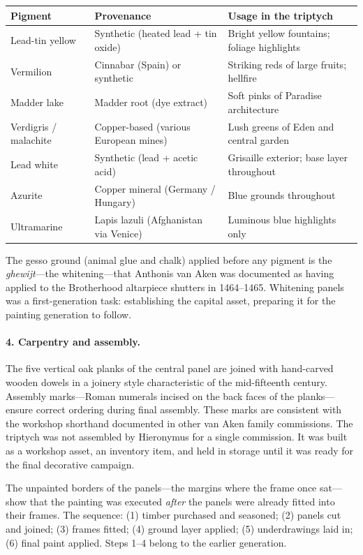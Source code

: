 \begin{center}
\begin{tabular}{lll}
\toprule
\textbf{Pigment} & \textbf{Provenance} & \textbf{Usage in the triptych} \\
\midrule
Lead-tin yellow & Synthetic (heated lead + tin oxide) & Bright yellow fountains; foliage highlights \\
Vermilion & Cinnabar (Spain) or synthetic & Striking reds of large fruits; hellfire \\
Madder lake & Madder root (dye extract) & Soft pinks of Paradise architecture \\
Verdigris / malachite & Copper-based (various European mines) & Lush greens of Eden and central garden \\
Lead white & Synthetic (lead + acetic acid) & Grisaille exterior; base layer throughout \\
Azurite & Copper mineral (Germany / Hungary) & Blue grounds throughout \\
Ultramarine & Lapis lazuli (Afghanistan via Venice) & Luminous blue highlights only \\
\bottomrule
\end{tabular}
\end{center}

The gesso ground (animal glue and chalk) applied before any pigment is the
\textit{ghewijt}---the whitening---that Anthonis van Aken was documented as
having applied to the Brotherhood altarpiece shutters in 1464--1465.
Whitening panels was a first-generation task: establishing the capital
asset, preparing it for the painting generation to follow.

\paragraph{4. Carpentry and assembly.}
The five vertical oak planks of the central panel are joined with
hand-carved wooden dowels in a joinery style characteristic of the
mid-fifteenth century.  Assembly marks---Roman numerals incised on the
back faces of the planks---ensure correct ordering during final assembly.
These marks are consistent with the workshop shorthand documented in other
van Aken family commissions.  The triptych was not assembled by Hieronymus
for a single commission.  It was built as a workshop asset, an inventory
item, and held in storage until it was ready for the final decorative
campaign.

The unpainted borders of the panels---the margins where the frame once
sat---show that the painting was executed \textit{after} the panels were
already fitted into their frames.  The sequence: (1) timber purchased and
seasoned; (2) panels cut and joined; (3) frames fitted; (4) ground layer
applied; (5) underdrawings laid in; (6) final paint applied.  Steps 1--4
belong to the earlier generation.

